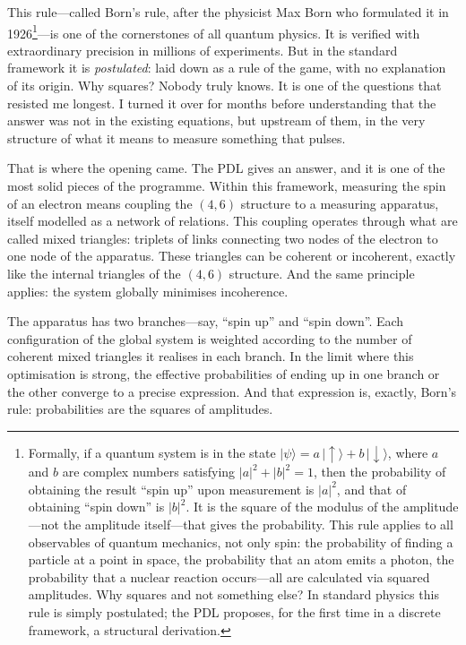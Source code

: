 \documentclass[12pt, a4paper, openright]{book}
\begin{document}
This rule---called Born's rule, after the physicist Max Born who formulated it in 1926\footnote{Formally, if a quantum system is in the state $|\psi\rangle = a\,|\!\uparrow\rangle + b\,|\!\downarrow\rangle$, where $a$ and $b$ are complex numbers satisfying $|a|^2 + |b|^2 = 1$, then the probability of obtaining the result ``spin up'' upon measurement is $|a|^2$, and that of obtaining ``spin down'' is $|b|^2$. It is the square of the modulus of the amplitude---not the amplitude itself---that gives the probability. This rule applies to all observables of quantum mechanics, not only spin: the probability of finding a particle at a point in space, the probability that an atom emits a photon, the probability that a nuclear reaction occurs---all are calculated via squared amplitudes. Why squares and not something else? In standard physics this rule is simply postulated; the PDL proposes, for the first time in a discrete framework, a structural derivation.}---is one of the cornerstones of all quantum physics. It is verified with extraordinary precision in millions of experiments. But in the standard framework it is \emph{postulated}: laid down as a rule of the game, with no explanation of its origin. Why squares? Nobody truly knows. It is one of the questions that resisted me longest. I turned it over for months before understanding that the answer was not in the existing equations, but upstream of them, in the very structure of what it means to measure something that pulses.

\medskip

That is where the opening came. The PDL gives an answer, and it is one of the most solid pieces of the programme. Within this framework, measuring the spin of an electron means coupling the $(4,6)$ structure to a measuring apparatus, itself modelled as a network of relations. This coupling operates through what are called mixed triangles: triplets of links connecting two nodes of the electron to one node of the apparatus. These triangles can be coherent or incoherent, exactly like the internal triangles of the $(4,6)$ structure. And the same principle applies: the system globally minimises incoherence.

\medskip

The apparatus has two branches---say, ``spin up'' and ``spin down''. Each configuration of the global system is weighted according to the number of coherent mixed triangles it realises in each branch. In the limit where this optimisation is strong, the effective probabilities of ending up in one branch or the other converge to a precise expression. And that expression is, exactly, Born's rule: probabilities are the squares of amplitudes.
\end{document}
